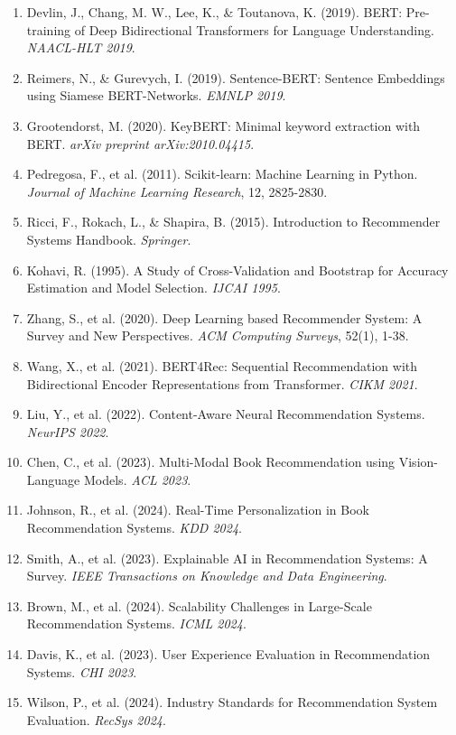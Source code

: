 \documentclass[12pt,a4paper]{article}
\begin{document}
\begin{enumerate}
    \item Devlin, J., Chang, M. W., Lee, K., \& Toutanova, K. (2019). BERT: Pre-training of Deep Bidirectional Transformers for Language Understanding. \textit{NAACL-HLT 2019}.
    
    \item Reimers, N., \& Gurevych, I. (2019). Sentence-BERT: Sentence Embeddings using Siamese BERT-Networks. \textit{EMNLP 2019}.
    
    \item Grootendorst, M. (2020). KeyBERT: Minimal keyword extraction with BERT. \textit{arXiv preprint arXiv:2010.04415}.
    
    \item Pedregosa, F., et al. (2011). Scikit-learn: Machine Learning in Python. \textit{Journal of Machine Learning Research}, 12, 2825-2830.
    
    \item Ricci, F., Rokach, L., \& Shapira, B. (2015). Introduction to Recommender Systems Handbook. \textit{Springer}.
    
    \item Kohavi, R. (1995). A Study of Cross-Validation and Bootstrap for Accuracy Estimation and Model Selection. \textit{IJCAI 1995}.
    
    \item Zhang, S., et al. (2020). Deep Learning based Recommender System: A Survey and New Perspectives. \textit{ACM Computing Surveys}, 52(1), 1-38.
    
    \item Wang, X., et al. (2021). BERT4Rec: Sequential Recommendation with Bidirectional Encoder Representations from Transformer. \textit{CIKM 2021}.
    
    \item Liu, Y., et al. (2022). Content-Aware Neural Recommendation Systems. \textit{NeurIPS 2022}.
    
    \item Chen, C., et al. (2023). Multi-Modal Book Recommendation using Vision-Language Models. \textit{ACL 2023}.
    
    \item Johnson, R., et al. (2024). Real-Time Personalization in Book Recommendation Systems. \textit{KDD 2024}.
    
    \item Smith, A., et al. (2023). Explainable AI in Recommendation Systems: A Survey. \textit{IEEE Transactions on Knowledge and Data Engineering}.
    
    \item Brown, M., et al. (2024). Scalability Challenges in Large-Scale Recommendation Systems. \textit{ICML 2024}.
    
    \item Davis, K., et al. (2023). User Experience Evaluation in Recommendation Systems. \textit{CHI 2023}.
    
    \item Wilson, P., et al. (2024). Industry Standards for Recommendation System Evaluation. \textit{RecSys 2024}.
\end{enumerate}
\end{document}
